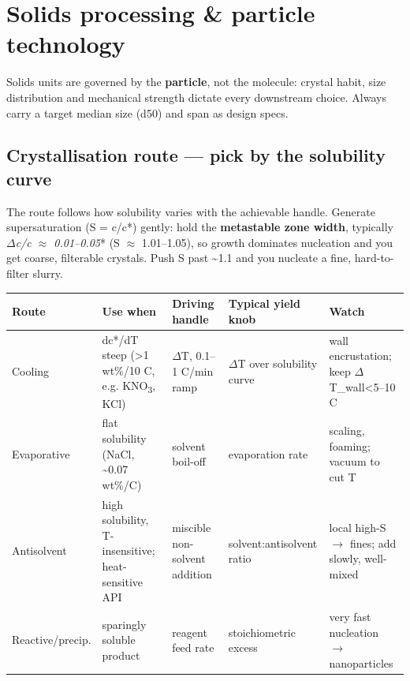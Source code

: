 \documentclass[11pt,a4paper]{article}
\begin{document}
\hypertarget{solids-processing--particle-technology}{%
\section{Solids processing \& particle
technology}\label{solids-processing--particle-technology}}

Solids units are governed by the \textbf{particle}, not the molecule:
crystal habit, size distribution and mechanical strength dictate every
downstream choice. Always carry a target median size (d50) and span as
design specs.

\hypertarget{crystallisation-route--pick-by-the-solubility-curve}{%
\subsection{Crystallisation route --- pick by the solubility
curve}\label{crystallisation-route--pick-by-the-solubility-curve}}

The route follows how solubility varies with the achievable handle.
Generate supersaturation (S = c/c*) gently: hold the \textbf{metastable
zone width}, typically \emph{\emph{\(\Delta\)c/c} \(\approx\) 0.01--0.05}* (S \(\approx\)
1.01--1.05), so growth dominates nucleation and you get coarse,
filterable crystals. Push S past \textasciitilde1.1 and you nucleate a
fine, hard-to-filter slurry.

\begin{longtable}[]{@{}>{\raggedright\arraybackslash}p{\dimexpr(\linewidth-10\tabcolsep)/5\relax}>{\raggedright\arraybackslash}p{\dimexpr(\linewidth-10\tabcolsep)/5\relax}>{\raggedright\arraybackslash}p{\dimexpr(\linewidth-10\tabcolsep)/5\relax}>{\raggedright\arraybackslash}p{\dimexpr(\linewidth-10\tabcolsep)/5\relax}>{\raggedright\arraybackslash}p{\dimexpr(\linewidth-10\tabcolsep)/5\relax}@{}}
\toprule\noalign{}
Route & Use when & Driving handle & Typical yield knob & Watch \\
\midrule\noalign{}
\endhead
\bottomrule\noalign{}
\endlastfoot
Cooling & dc*/dT steep (\textgreater1 wt\%/10 \textdegree{}C, e.g. KNO\textsubscript{3}, KCl) & \(\Delta\)T,
0.1--1 \textdegree{}C/min ramp & \(\Delta\)T over solubility curve & wall encrustation; keep
\(\Delta\)T\_wall\textless5--10 \textdegree{}C \\
Evaporative & flat solubility (NaCl, \textasciitilde0.07 wt\%/\textdegree{}C) &
solvent boil-off & evaporation rate & scaling, foaming; vacuum to cut
T \\
Antisolvent & high solubility, T-insensitive; heat-sensitive API &
miscible non-solvent addition & solvent:antisolvent ratio & local high-S
\(\rightarrow\) fines; add slowly, well-mixed \\
Reactive/precip. & sparingly soluble product & reagent feed rate &
stoichiometric excess & very fast nucleation \(\rightarrow\) nanoparticles \\
\end{longtable}
\end{document}
